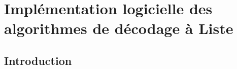 \chapter{Implémentation logicielle des algorithmes de décodage à Liste} %


\vspace*{\fill}
\minitocTITI
\vspace*{\fill}
\newpage


\section*{Introduction}

\begin{figure}[t]
  \centering
  \quad\quad
\end{figure}

